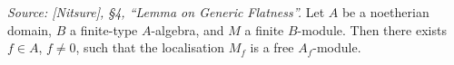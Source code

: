 \begin{theorem}



  \label{thm:generic_flatness_algebraic}
  \textit{Source: [Nitsure], \S4, ``Lemma on Generic Flatness''.}
  Let \(A\) be a noetherian domain, \(B\) a finite-type \(A\)-algebra, and \(M\) a finite
  \(B\)-module. Then there exists \(f \in A\), \(f \ne 0\), such that the localisation
  \(M_f\) is a free \(A_f\)-module.

\end{theorem}

